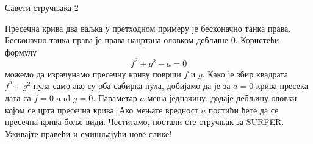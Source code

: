 \documentclass[sr]{./../../common/SurferDesc}%
\begin{document}
\footnotesize
%

 
 \begin{surferPage}
  \begin{surferTitle}Савети стручњака 2\end{surferTitle}
   \begin{surferText}

Пресечна крива два ваљка у претходном примеру је бесконачно танка права. Бесконачно танка права је права нацртана оловком дебљине 0. Користећи формулу
\[ f^2+g^2-a=0\]
можемо да израчунамо пресечну криву површи $f$ и $g$. Како је збир квадрата $f^2+g^2$ нула само ако су оба сабирка нула, добијамо да је за $a=0$ крива пресека дата са $f=0$ and $g=0$.
Параметар $a$ мења једначину: додаје дебљину оловки којом се црта пресечна крива. Ако мењате вредност $a$ постићи ћете да се пресечна крива боље види.
\newline \newline
Честитамо, постали сте стручњак за SURFER. Уживајте правећи и смишљајући нове слике!
 


     \end{surferText}
\end{surferPage}

\end{document}

